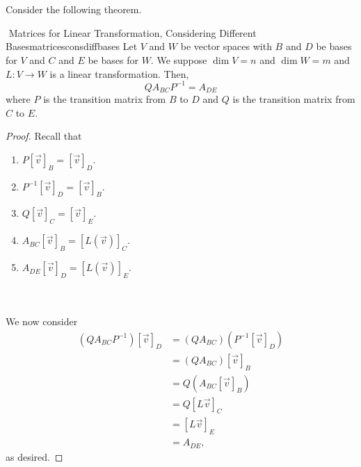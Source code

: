        \pagebreak
        \vphantom
        \\
        \\
        Consider the following theorem.
        \begin{theorem}{\Stop\,\,Matrices for Linear Transformation, Considering Different Bases}{matricesconsdiffbases}
            Let \(V\) and \(W\) be vector spaces with \(B\) and \(D\) be bases for \(V\) and \(C\) and \(E\) be bases for \(W\). We suppose \(\dim V = n\) and \(\dim W = m\) and \(L:V\to W\) is a linear transformation. Then,
            \begin{equation*}
                QA_{BC}P^{-1}=A_{DE}
            \end{equation*}
            where \(P\) is the transition matrix from \(B\) to \(D\) and \(Q\) is the transition matrix from \(C\) to \(E\).
            \begin{proof}
                Recall that
                \begin{enumerate}
                    \item \(P[\vec{v}]_B=[\vec{v}]_D\).
                    \item \(P^{-1}[\vec{v}]_D=[\vec{v}]_B\).
                    \item \(Q[\vec{v}]_C=[\vec{v}]_E\).
                    \item \(A_{BC}[\vec{v}]_B=[L(\vec{v})]_C\).
                    \item \(A_{DE}[\vec{v}]_D=[L(\vec{v})]_E\).
                \end{enumerate}
                \vphantom
                \\
                \\
                We now consider
                \begin{align*}
                    (QA_{BC}P^{-1})[\vec{v}]_D&=(QA_{BC})(P^{-1}[\vec{v}]_D) \\
                    &=(QA_{BC})[\vec{v}]_B \\
                    &=Q(A_{BC}[\vec{v}]_B) \\
                    &=Q[L\vec{v}]_C \\
                    &=[L\vec{v}]_E \\
                    &=A_{DE},
                \end{align*}
                as desired.
            \end{proof}
        \end{theorem}
        \vphantom
        \\
